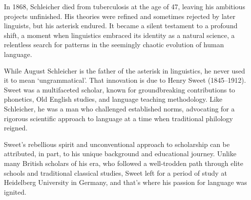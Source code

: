 

In 1868, Schleicher died from tuberculosis at the age of 47, leaving his ambitious projects unfinished. His theories were refined and sometimes rejected by later linguists, but his asterisk endured. It became a silent testament to a profound shift, a moment when linguistics embraced its identity as a natural science, a relentless search for patterns in the seemingly chaotic evolution of human language.

\bigskip

While August Schleicher is the father of the asterisk in linguistics, he never used it to mean `ungrammatical'. That innovation is due to Henry Sweet (1845--1912). Sweet was a multifaceted scholar, known for groundbreaking contributions to phonetics, Old English studies, and language teaching methodology. Like Schleicher, he was a man who challenged established norms, advocating for a rigorous scientific approach to language at a time when traditional philology reigned.

Sweet's rebellious spirit and unconventional approach to scholarship can be attributed, in part, to his unique background and educational journey. Unlike many British scholars of his era, who followed a well-trodden path through elite schools and traditional classical studies, Sweet left for a period of study at Heidelberg University in Germany, and that's where his passion for language was ignited.


